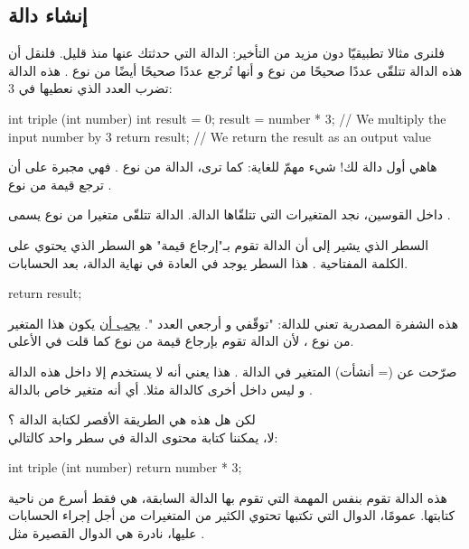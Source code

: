 \subsection{إنشاء دالة}

فلنرى مثالا تطبيقيّا دون مزيد من التأخير: الدالة 
التي حدثتك عنها منذ قليل. فلنقل أن هذه الدالة تتلقّى عددًا صحيحًا من نوع 
و أنها تُرجع عددًا صحيحًا أيضًا من نوع 
.
هذه الدالة تضرب العدد الذي نعطيها في 3:

\begin{Csource}
int triple (int number)
{
	int result = 0;
	result = number * 3; // We multiply the input number by 3
	return result; // We return the result as an output value
}
\end{Csource}

هاهي أول دالة لك! شيء مهمّ للغاية: كما ترى، الدالة من نوع 
.
فهي مجبرة على  أن ترجع قيمة من نوع
.

داخل القوسين، نجد المتغيرات التي تتلقّاها الدالة. الدالة 
تتلقّى متغيرا من نوع 
يسمى 
.

السطر الذي يشير إلى أن الدالة تقوم بـ"إرجاع قيمة" هو السطر الذي يحتوي على الكلمة المفتاحية 
.
هذا السطر يوجد في العادة في نهاية الدالة، بعد الحسابات.

\begin{Csource}
return result;
\end{Csource}

هذه الشفرة المصدرية تعني للدالة: "توقّفي و أرجعي العدد 
".
\underline{يجب أن}
يكون هذا المتغير
من نوع
،
لأن الدالة تقوم بإرجاع قيمة من نوع
كما قلت في الأعلى.

صرّحت عن (= أنشأت) المتغير 
في الدالة 
.
هذا يعني أنه لا يستخدم إلا داخل هذه الدالة و ليس داخل أخرى كالدالة
مثلا. أي أنه متغير خاص بالدالة 
.

لكن هل هذه هي الطريقة الأقصر لكتابة الدالة
؟\\
لا، يمكننا كتابة محتوى الدالة في سطر واحد كالتالي:

\begin{Csource}
int triple (int number)
{
	return number * 3;
}
\end{Csource}

هذه الدالة تقوم بنفس المهمة التي تقوم بها الدالة السابقة، هي فقط أسرع من ناحية كتابتها. عمومًا، الدوال التي تكتبها تحتوي الكثير من المتغيرات من أجل إجراء الحسابات عليها، نادرة هي الدوال القصيرة مثل
.


